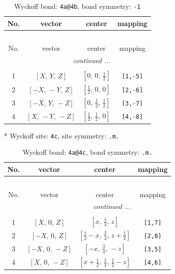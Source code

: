 \documentclass[fleqn,8pt]{jsarticle}
\begin{document}
\begin{longtable}{cccc}
\caption{Wyckoff bond: {\tt 4a@4b}, bond symmetry: {\tt -1}}
 \\
 \hline \hline
No. & vector & center & mapping \\ \hline \endfirsthead

\multicolumn{3}{l}{\tablename\ \thetable{}} \\
 \hline \hline
No. & vector & center & mapping \\ \hline \endhead

 \hline \hline
\multicolumn{3}{r}{\footnotesize\it continued ...} \\ \endfoot

 \hline \hline
\multicolumn{3}{r}{} \\ \endlastfoot

1 & $\left[ X,\, Y,\, Z \right]$ & $\left[ 0,\, 0,\, \frac{1}{2} \right]$ & {\tt [1,-5]} \\ \hline
2 & $\left[ - X,\, - Y,\, Z \right]$ & $\left[ \frac{1}{2},\, 0,\, 0 \right]$ & {\tt [2,-6]} \\ \hline
3 & $\left[ - X,\, Y,\, - Z \right]$ & $\left[ 0,\, \frac{1}{2},\, \frac{1}{2} \right]$ & {\tt [3,-7]} \\ \hline
4 & $\left[ X,\, - Y,\, - Z \right]$ & $\left[ \frac{1}{2},\, \frac{1}{2},\, 0 \right]$ & {\tt [4,-8]} \\
\end{longtable}
* Wyckoff site: {\tt 4c}, site symmetry: {\tt .m.}
\renewcommand{\arraystretch}{1.2}
\begin{longtable}{cccc}
\caption{Wyckoff bond: {\tt 4a@4c}, bond symmetry: {\tt .m.}}
 \\
 \hline \hline
No. & vector & center & mapping \\ \hline \endfirsthead

\multicolumn{3}{l}{\tablename\ \thetable{}} \\
 \hline \hline
No. & vector & center & mapping \\ \hline \endhead

 \hline \hline
\multicolumn{3}{r}{\footnotesize\it continued ...} \\ \endfoot

 \hline \hline
\multicolumn{3}{r}{} \\ \endlastfoot

1 & $\left[ X,\, 0,\, Z \right]$ & $\left[ x,\, \frac{1}{4},\, z \right]$ & {\tt [1,7]} \\ \hline
2 & $\left[ - X,\, 0,\, Z \right]$ & $\left[ \frac{1}{2} - x,\, \frac{3}{4},\, z + \frac{1}{2} \right]$ & {\tt [2,8]} \\ \hline
3 & $\left[ - X,\, 0,\, - Z \right]$ & $\left[ - x,\, \frac{3}{4},\, - z \right]$ & {\tt [3,5]} \\ \hline
4 & $\left[ X,\, 0,\, - Z \right]$ & $\left[ x + \frac{1}{2},\, \frac{1}{4},\, \frac{1}{2} - z \right]$ & {\tt [4,6]} \\
\end{longtable}
\end{document}
